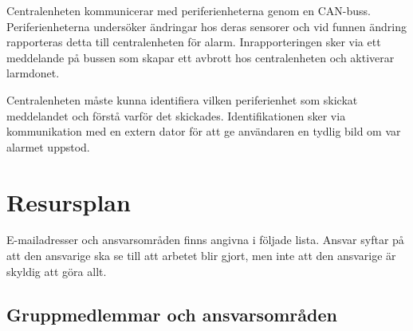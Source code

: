 \documentclass[a4paper]{article}
\begin{document}
Centralenheten kommunicerar med periferienheterna genom en CAN-buss. Periferienheterna undersöker ändringar hos deras sensorer och vid funnen ändring rapporteras detta till centralenheten för alarm. Inrapporteringen sker via ett meddelande på bussen som skapar ett avbrott hos centralenheten och aktiverar larmdonet.

Centralenheten måste kunna identifiera vilken periferienhet som skickat meddelandet och förstå varför det skickades. Identifikationen sker via kommunikation med en extern dator för att ge användaren en tydlig bild om var alarmet uppstod.

\section{Resursplan}

E-mailadresser och ansvarsområden finns angivna i följade lista. Ansvar syftar på att den ansvarige ska se till att arbetet blir gjort, men inte att den ansvarige är skyldig att göra allt.

\subsection{Gruppmedlemmar och ansvarsområden}
\end{document}
